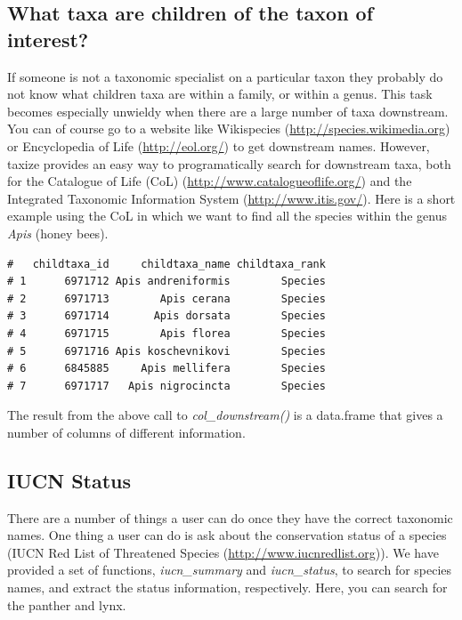 \begin{sloppypar}
\subsection{What taxa are children of the taxon of interest?}
If someone is not a taxonomic specialist on a particular taxon they probably do not know what children taxa are within a family, or within a genus. 
This task becomes especially unwieldy when there are a large number of taxa downstream. 
You can of course go to a website like Wikispecies (\url{http://species.wikimedia.org}) or Encyclopedia of Life (\url{http://eol.org/}) to get downstream names. 
However, taxize provides an easy way to programatically search for downstream taxa, both for the Catalogue of Life (CoL) (\url{http://www.catalogueoflife.org/}) and the Integrated Taxonomic Information System (\url{http://www.itis.gov/}). 
Here is a short example using the CoL in which we want to find all the species within the genus \emph{Apis} (honey bees).

\begin{knitrout}
\small
{}
\color{fgcolor}
\begin{kframe}
\begin{alltt}
\hlstd{(} \hlstd{=} \hlstd{,}  \hlstd{=} \hlstd{)[[}\hlstd{]]}
\end{alltt}
\begin{verbatim}
#   childtaxa_id     childtaxa_name childtaxa_rank
# 1      6971712 Apis andreniformis        Species
# 2      6971713        Apis cerana        Species
# 3      6971714       Apis dorsata        Species
# 4      6971715        Apis florea        Species
# 5      6971716 Apis koschevnikovi        Species
# 6      6845885     Apis mellifera        Species
# 7      6971717   Apis nigrocincta        Species
\end{verbatim}
\end{kframe}
\end{knitrout}

The result from the above call to \emph{col\_downstream()} is a data.frame that gives a number of columns of different information.


\subsection{IUCN Status}
There are a number of things a user can do once they have the correct taxonomic names. 
One thing a user can do is ask about the conservation status of a species (IUCN Red List of Threatened Species (\url{http://www.iucnredlist.org})). 
We have provided a set of functions, \emph{iucn\_summary} and \emph{iucn\_status}, to search for species names, and extract the status information, respectively. 
Here, you can search for the panther and lynx.


\end{sloppypar}

